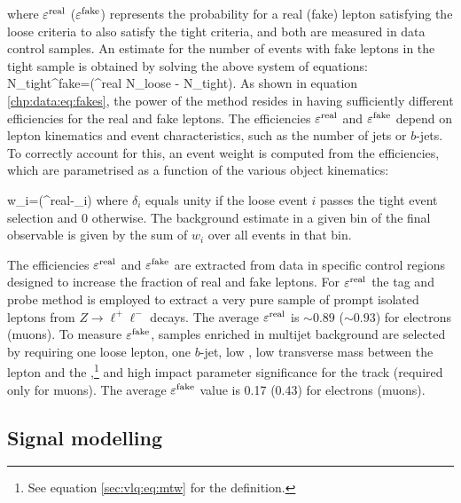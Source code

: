 \noindent where $\epsilon^{\rm real}$ ($\epsilon^{\rm fake}$) represents the probability for a real (fake) lepton satisfying the loose criteria to also satisfy the tight criteria, and both are measured in data control samples. An estimate for the number of events with fake leptons in the tight sample is obtained by solving the above system of equations:
\be
N_{\rm tight}^{\rm fake}=\cdot (\epsilon^{\rm real} \cdot N_{\rm loose} - N_{\rm tight}).
\label{chp:data:eq:fakes}
\ee
As shown in equation \ref{chp:data:eq:fakes}, the power of the method resides in having sufficiently different efficiencies for the real and fake leptons. 
The efficiencies $\epsilon^{\rm real}$ and $\epsilon^{\rm fake}$ depend on lepton kinematics and event characteristics, such as the number of jets or $b$-jets. To correctly account for this, an event weight is computed from the efficiencies, which are parametrised as a function of the various object kinematics:

\be
w_{i}=\cdot (\epsilon^{\rm real}-\delta_{i})
\ee
where $\delta_{i}$ equals unity if the loose event $i$ passes the tight event selection and 0 otherwise. The background estimate in a given bin of the final observable is given by the sum of $w_{i}$ over all events in that bin.


The efficiencies $\epsilon^{\rm real}$ and $\epsilon^{\rm fake}$ are extracted from data in specific control regions designed to increase the fraction of real and fake leptons. For $\epsilon^{\rm real}$  the tag and probe method is employed to extract a very pure sample of prompt isolated leptons from $Z\to \ell^{+}\ell^{-}$ decays. The average $\epsilon^{\rm real}$ is $\sim0.89$ ($\sim0.93$) for electrons (muons). To measure $\epsilon^{\rm fake}$, samples enriched in multijet background are selected by requiring one loose lepton, one $b$-jet, low \MET, low transverse mass between the lepton and the \MET,\footnote{See equation \ref{sec:vlq:eq:mtw} for the definition.} and high impact parameter significance for the track (required only for muons). The average $\epsilon^{\rm fake}$ value is 0.17 (0.43) for electrons (muons).


\subsection{Signal modelling}
